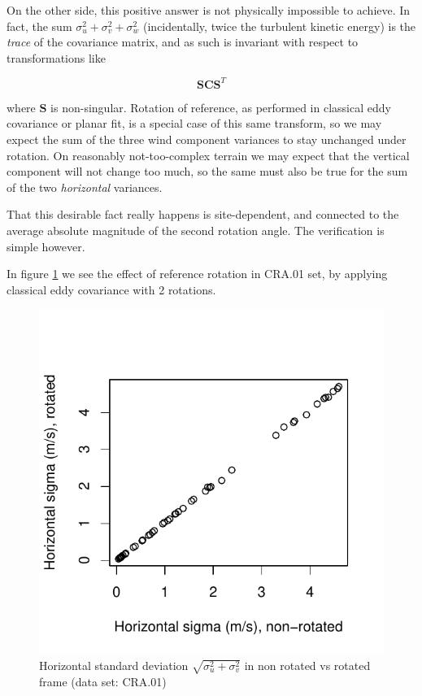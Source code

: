 \documentclass[a4paper,10pt]{book}
\begin{document}
On the other side, this positive answer is not physically impossible to achieve. In fact, the sum $\sigma_{u}^{2} + \sigma_{v}^{2} + \sigma_{w}^{2}$ (incidentally, twice the turbulent kinetic energy) is the \emph{trace} of the covariance matrix, and as such is invariant with respect to transformations like

\begin{equation}\label{eq:Matrix Conjugation}
    \mathbf{S} \mathbf{C} \mathbf{S}^{T}
\end{equation}

\noindent where $\mathbf{S}$ is non-singular. Rotation of reference, as performed in classical eddy covariance or planar fit, is a special case of this same transform, so we may expect the sum of the three wind component variances to stay unchanged under rotation. On reasonably not-too-complex terrain we may expect that the vertical component will not change too much, so the same must also be true for the sum of the two \emph{horizontal} variances.

That this desirable fact really happens is site-dependent, and connected to the average absolute magnitude of the second rotation angle. The verification is simple however.

In figure \ref{fig:Sigma_uv} we see the effect of reference rotation in CRA.01 set, by applying classical eddy covariance with 2 rotations.

\begin{figure}[htp]
 \centering
 \begin{center}
 \includegraphics[scale=1.1,keepaspectratio=true]{./diagrams/sigma_uv.pdf}
 \end{center}
 \caption{Horizontal standard deviation $\sqrt{\sigma_{u}^{2} + \sigma_{v}^{2}}$ in non rotated vs rotated frame (data set: CRA.01)}
 \label{fig:Sigma_uv}
\end{figure}
\end{document}
